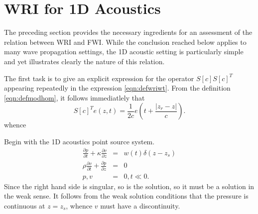 \section{WRI for 1D Acoustics}
The preceding section provides the necessary ingredients for an assessment of the relation between WRI and FWI. While the conclusion reached below applies to many wave propagation settings, the 1D acoustic setting is particularly simple and yet illustrates clearly the nature of this relation.

The first task is to give an explicit expression for the operator $S[c]S[c]^T$ appearing repeatedly in the expression \ref{eqn:defwriwt}. From the definition \ref{eqn:defmodhom}, it follows immediatlely that 
\begin{equation}
  \label{eqn:stmodhompwtrans}
S[c]^Te(z,t)=\frac{1}{2c}e\left(t +  \frac{|z_r-z|}{c}\right). 
\end{equation}
whence

Begin with the 1D acoustics point source system. 
\begin{eqnarray}
\label{eqn:awe1dptsrc}
\frac{\partial p}{\partial t} +\kappa\frac{\partial 
  v}{\partial z} &=& w(t)\delta(z-z_s) \nonumber\\
\rho \frac{\partial v}{\partial t} + \frac{\partial p}{\partial 
  z}&=&0\nonumber\\
 p,v&=&0, t \ll 0. 
\end{eqnarray}
Since the right hand side is singular, so is the solution, so it must
be a solution in the weak sense. It follows from the weak solution
conditions that the pressure is continuous at $z=z_s$, whence $v$ must
have a discontinuity. 

